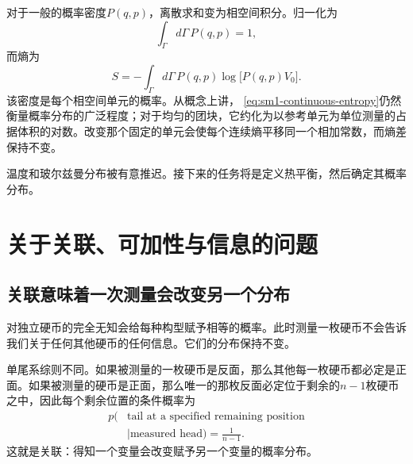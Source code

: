 对于一般的概率密度\(P(q,p)\)，离散求和变为相空间积分。归一化为
\begin{equation}
 \int_\Gamma d\Gamma\,P(q,p)=1,
 \label{eq:sm1-continuous-normalization}
\end{equation}
而熵为
\begin{equation}
 S=-\int_\Gamma d\Gamma\,
 P(q,p)\log\!\bigl[P(q,p)V_0\bigr].
 \label{eq:sm1-continuous-entropy}
\end{equation}
该密度是每个相空间单元的概率。从概念上讲，
\eqref{eq:sm1-continuous-entropy}仍然衡量概率分布的广泛程度；对于均匀的团块，它约化为以参考单元为单位测量的占据体积的对数。改变那个固定的单元会使每个连续熵平移同一个相加常数，而熵差保持不变。

\begin{classroomqa}
\end{classroomqa}

温度和玻尔兹曼分布被有意推迟。接下来的任务将是定义热平衡，然后确定其概率分布。

\section{关于关联、可加性与信息的问题}

\subsection{关联意味着一次测量会改变另一个分布}

对独立硬币的完全无知会给每种构型赋予相等的概率。此时测量一枚硬币不会告诉我们关于任何其他硬币的任何信息。它们的分布保持不变。

单尾系综则不同。如果被测量的一枚硬币是反面，那么其他每一枚硬币都必定是正面。如果被测量的硬币是正面，那么唯一的那枚反面必定位于剩余的\(n-1\)枚硬币之中，因此每个剩余位置的条件概率为
\begin{equation}
\begin{aligned}
 p(&\text{tail at a specified remaining position}\\
   &\mid\text{measured head})=\frac{1}{n-1}.
\end{aligned}
 \label{eq:sm1-conditional-tail}
\end{equation}
这就是关联：得知一个变量会改变赋予另一个变量的概率分布。

\begin{classroomqa}
\end{classroomqa}

